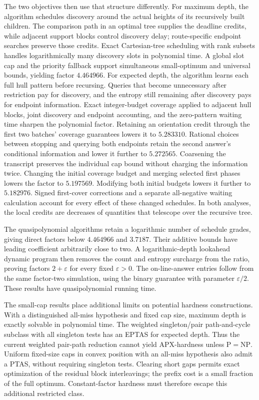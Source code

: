 The two objectives then use that structure differently. For maximum
depth, the algorithm schedules discovery around the actual heights
of its recursively built children. The comparison path in an
optimal tree supplies the deadline credits, while adjacent support
blocks control discovery delay; route-specific endpoint searches
preserve those credits. Exact Cartesian-tree scheduling with rank
subsets handles logarithmically many discovery slots in polynomial
time. A global slot cap and the priority fallback support simultaneous
small-optimum and universal bounds, yielding factor $4.464966$.
For expected depth, the algorithm
learns each full hull pattern before recursing. Queries that become
unnecessary after restriction pay for discovery, and the entropy
still remaining after discovery pays for endpoint information.
Exact integer-budget coverage applied to adjacent hull blocks,
joint discovery and endpoint accounting, and the zero-pattern waiting
time sharpen the polynomial factor. Retaining an orientation credit
through the first two batches' coverage guarantees lowers it to $5.283310$.
Rational choices between stopping and querying both endpoints retain
the second answer's conditional information and lower it further to
$5.272565$. Coarsening the transcript preserves the individual cap
bound without charging the information twice. Changing the initial
coverage budget and merging selected first phases lowers the factor to
$5.197569$. Modifying both initial budgets lowers it further to
$5.182976$. Signed first-cover corrections and a separate all-negative
waiting calculation account for every effect of these changed schedules.
In both analyses, the local credits
are decreases of quantities that telescope over the recursive tree.

The quasipolynomial algorithms retain a logarithmic number of schedule
grades, giving direct factors below $4.464966$ and $3.7187$.
Their additive bounds have leading coefficient arbitrarily close to
two. A logarithmic-depth lookahead dynamic program then removes the
count and entropy surcharge from the ratio, proving factors
$2+\varepsilon$ for every fixed $\varepsilon>0$.
The on-line-answer entries follow from the same factor-two simulation,
using the binary guarantee with parameter $\varepsilon/2$.
These results have quasipolynomial running time.

The small-cap results place additional limits on potential hardness
constructions. With a distinguished all-miss hypothesis and fixed
cap size, maximum depth is exactly solvable in polynomial time.
The weighted singleton/pair path-and-cycle subclass with all
singleton tests has an EPTAS for expected depth. Thus the current
weighted pair-path reduction cannot yield APX-hardness unless
$\mathrm P=\mathrm{NP}$.
Uniform fixed-size caps in convex position with an all-miss hypothesis
also admit a PTAS, without requiring singleton tests. Clearing short
gaps permits exact optimization of the residual block interleavings;
the prefix cost is a small fraction of the full optimum. Constant-factor
hardness must therefore escape this additional restricted class.

